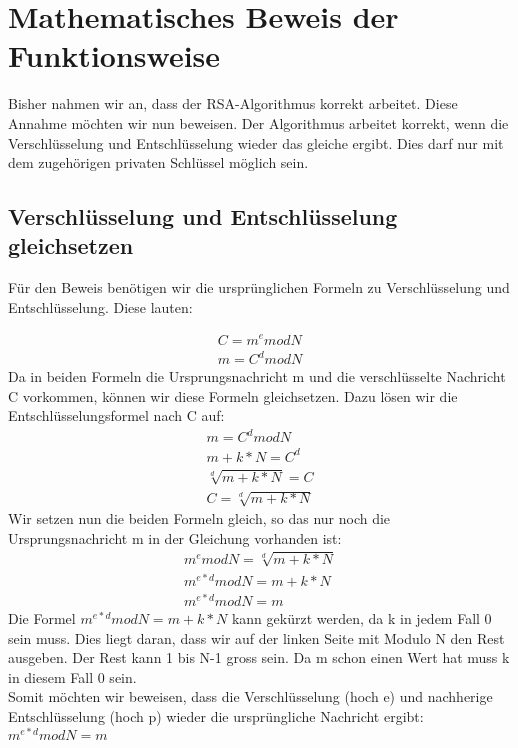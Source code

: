 \section{Mathematisches Beweis der Funktionsweise}
Bisher nahmen wir an, dass der RSA-Algorithmus korrekt arbeitet. Diese Annahme möchten wir nun beweisen. Der Algorithmus arbeitet korrekt, wenn die Verschlüsselung und Entschlüsselung wieder das gleiche ergibt. Dies darf nur mit dem zugehörigen privaten Schlüssel möglich sein.

\subsection{Verschlüsselung und Entschlüsselung gleichsetzen}
Für den Beweis benötigen wir die ursprünglichen Formeln zu Verschlüsselung und Entschlüsselung. Diese lauten:

\begin{align}
  C = m^e mod N \\
  m = C^d mod N
\end{align}
Da in beiden Formeln die Ursprungsnachricht m und die verschlüsselte Nachricht C vorkommen, können wir diese Formeln gleichsetzen. Dazu lösen wir die Entschlüsselungsformel nach C auf:
\begin{align}
  m = C^d mod N \\
  m + k * N = C^d \\
  \sqrt[d]{m+k*N} = C \\
  C = \sqrt[d]{m+k*N}
\end{align}
Wir setzen nun die beiden Formeln gleich, so das nur noch die Ursprungsnachricht m in der Gleichung vorhanden ist:
\begin{align}
  m^e mod N = \sqrt[d]{m+k*N}\\
  m^{e*d} mod N = m + k * N\\
  m^{e*d} mod N = m
\end{align}
Die Formel $ m^{e*d} mod N = m + k * N $ kann gekürzt werden, da k in jedem Fall 0 sein muss. Dies liegt daran, dass wir auf der linken Seite mit Modulo N den Rest ausgeben. Der Rest kann 1 bis N-1 gross sein. Da m schon einen Wert hat muss k in diesem Fall 0 sein. \\
Somit möchten wir beweisen, dass die Verschlüsselung (hoch e) und nachherige Entschlüsselung (hoch p) wieder die ursprüngliche Nachricht ergibt:
$ m^{e*d} mod N = m $

